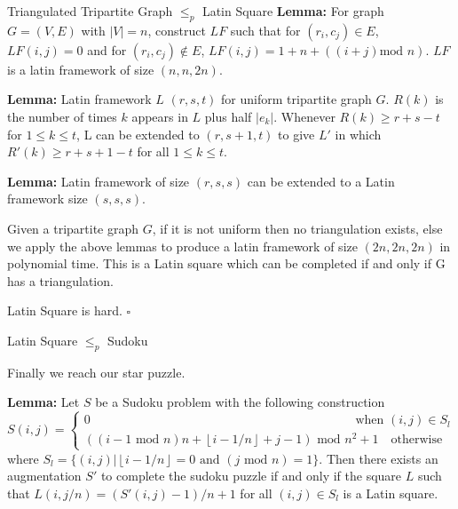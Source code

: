 \documentclass[final]{beamer}
\newlength{\colwidth}
\newcounter{col}
\begin{document}
\begin{frame}[t]
\begin{columns}[t]
\begin{column}{\colwidth}
\begin{block}{Triangulated Tripartite Graph $\leq_p$ Latin Square \cite{COLBOURN198425}}
\textbf{Lemma:} For graph $G=(V,E)$ with $|V|=n$, construct $LF$ such that for $(r_i,c_j)\in E$, $LF(i,j)=0$ and for $(r_i,c_j)\not\in E$, $LF(i,j)=1+n+((i+j)\text{mod }n)$. $ LF$ is a latin framework of size $(n,n,2n)$. 

\textbf{Lemma:} Latin framework $L$  $(r,s,t)$ for uniform tripartite graph $G$. $R(k)$ is the number of times $k$ appears in $L$ plus half $|e_k|$. Whenever $R(k)\ge r+s-t$ for $1 \le k \le t$, L can be extended to $(r,s+1,t)$ to give $L'$ in which $R'(k)\ge r + s+1-t$ for all $1\le k \le t$.

\textbf{Lemma:} Latin framework of size $(r,s,s)$ can be extended to a Latin framework size $(s,s,s)$.

Given a tripartite graph $G$, if it is not uniform then no triangulation exists, else we apply the above lemmas to produce a latin framework of size $(2n,2n,2n)$ in polynomial time. This is a Latin square which can be completed if and only if G has a triangulation. 

Latin Square is hard. $\square$

  \end{block}
\begin{block}{ Latin Square $\leq_p$ Sudoku \cite{article}}

Finally we reach our star puzzle.

\textbf{Lemma:} Let $S$ be a Sudoku problem with the following construction 
\begin{equation}
	S(i,j) =\begin{cases}
0 \qquad\qquad\qquad\qquad\qquad\qquad\qquad\qquad\quad\qquad\qquad\text{   when  } (i,j) \in S_l \\ 
((i-1 \text{ mod } n)n + \left\lfloor{i-1/n}\right\rfloor+j-1)\text{ mod } n^2 +1 \quad\text{otherwise}
\end{cases}
\end{equation}
where $S_l=\{(i,j)| \left\lfloor{i-1/n}\right\rfloor=0 \text{ and }(j \text{ mod }n)=1\}$. Then there exists an augmentation $S'$ to complete the sudoku puzzle if and only if the square $L$ such that $L(i,j/n)=(S'(i,j)-1)/n+1$ for all $(i,j) \in S_l$ is a Latin square.


\end{block}
\end{column}
\end{columns}
\end{frame}
\end{document}
